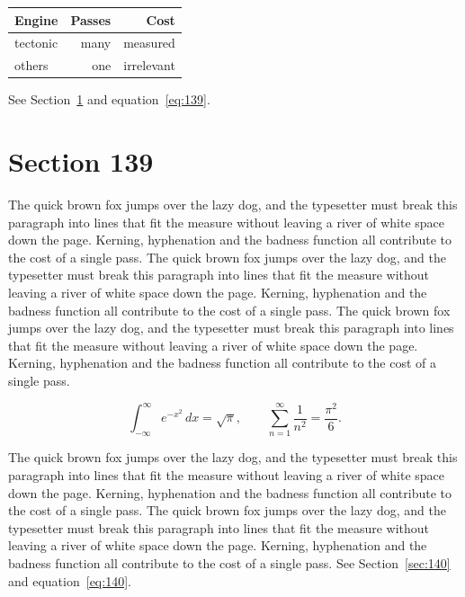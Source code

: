 \documentclass{article}
\begin{document}
\begin{center}
\begin{tabular}{lrr}
\toprule
Engine & Passes & Cost \\
\midrule
tectonic & many & measured \\
others & one & irrelevant \\
\bottomrule
\end{tabular}
\end{center}

See Section~\ref{sec:139} and equation~\eqref{eq:139}.
\section{Section 139}
\label{sec:139}
The quick brown fox jumps over the lazy dog, and the typesetter must break this paragraph into lines that fit the measure without leaving a river of white space down the page. Kerning, hyphenation and the badness function all contribute to the cost of a single pass. The quick brown fox jumps over the lazy dog, and the typesetter must break this paragraph into lines that fit the measure without leaving a river of white space down the page. Kerning, hyphenation and the badness function all contribute to the cost of a single pass. The quick brown fox jumps over the lazy dog, and the typesetter must break this paragraph into lines that fit the measure without leaving a river of white space down the page. Kerning, hyphenation and the badness function all contribute to the cost of a single pass. 

\begin{equation}\label{eq:139}
\int_{-\infty}^{\infty} e^{-x^{2}}\,dx = \sqrt{\pi}, \qquad
\sum_{n=1}^{\infty} \frac{1}{n^{2}} = \frac{\pi^{2}}{6}.
\end{equation}

The quick brown fox jumps over the lazy dog, and the typesetter must break this paragraph into lines that fit the measure without leaving a river of white space down the page. Kerning, hyphenation and the badness function all contribute to the cost of a single pass. The quick brown fox jumps over the lazy dog, and the typesetter must break this paragraph into lines that fit the measure without leaving a river of white space down the page. Kerning, hyphenation and the badness function all contribute to the cost of a single pass. 
See Section~\ref{sec:140} and equation~\eqref{eq:140}.
\end{document}
